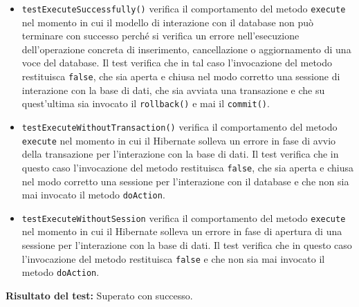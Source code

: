\begin{itemize}
\begin{itemize}
  \item \texttt{testExecuteSuccessfully()} verifica il comportamento del metodo \texttt{execute} nel momento in cui il modello di interazione con il database non può terminare con successo perché si verifica un errore nell'esecuzione dell'operazione concreta di inserimento, cancellazione o aggiornamento di una voce del database. Il test verifica che in tal caso l'invocazione del metodo restituisca \texttt{false}, che sia aperta e chiusa nel modo corretto una sessione di interazione con la base di dati, che sia avviata una transazione e che su quest'ultima sia invocato il \texttt{rollback()} e mai il \texttt{commit()}.
  
  \item \texttt{testExecuteWithoutTransaction()} verifica il comportamento del metodo \texttt{execute} nel momento in cui il  Hibernate solleva un errore in fase di avvio della transazione per l'interazione con la base di dati. Il test verifica che in questo caso l'invocazione del metodo restituisca \texttt{false}, che sia aperta e chiusa nel modo corretto una sessione per l'interazione con il database e che non sia mai invocato il metodo \texttt{doAction}.
  
  \item \texttt{testExecuteWithoutSession} verifica il comportamento del metodo \texttt{execute} nel momento in cui il  Hibernate solleva un errore in fase di apertura di una sessione per l'interazione con la base di dati. Il test verifica che in questo caso l'invocazione del metodo restituisca \texttt{false} e che non sia mai invocato il metodo \texttt{doAction}.
\end{itemize}

\textbf{Risultato del test:} Superato con successo.

\end{itemize}


